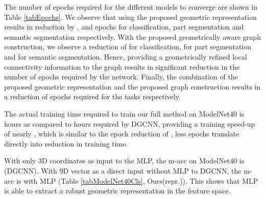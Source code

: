 The number of epochs required for the different models to converge are shown in Table
\ref{tabEpochs}. We observe that using the proposed geometric representation results in reduction by
,  and  epochs for classification, part segmentation and semantic segmentation
respectively. With the proposed geometrically aware graph construction, we observe a reduction of
 for classification,  for part segmentation and  for semantic segmentation. Hence,
providing a geometrically refined local connectivity information to the graph results in significant
reduction in the number of epochs required by the network. Finally, the combination of the proposed
geometric representation and the proposed graph construction results in a reduction of  epochs required for the tasks respectively.

The actual training time required to train our full method on ModelNet40 is  hours as
compared to  hours required by DGCNN, providing a training speed-up of nearly , which is
similar to the epoch reduction of , \ie less epochs translate directly into reduction
in training time. 

 With only 3D coordinates as input to the MLP, the m-acc on ModelNet40 is  \cf  (DGCNN). With 9D vector as a direct input without MLP to DGCNN, the m-acc is  \cf  with MLP (Table \ref{tabModelNet40Cls}, Ours(repr.)). This shows that MLP is able to extract a robust geometric representation in the feature space.
